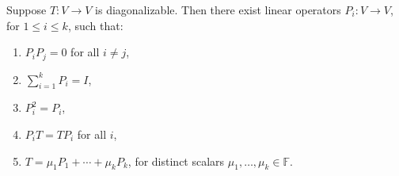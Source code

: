 \begin{corollary}\label{cor:spectral-decomposition}
Suppose \(T : V \to V\) is diagonalizable. Then there exist linear operators \(P_i : V \to V\), for \(1 \leq i \leq k\), such that:
\begin{enumerate}
    \item \(P_i P_j = 0\) for all \(i \neq j\),
    \item \(\sum_{i=1}^k P_i = I\),
    \item \(P_i^2 = P_i\),
    \item \(P_i T = T P_i\) for all \(i\),
    \item \(T = \mu_1 P_1 + \cdots + \mu_k P_k\), for distinct scalars \(\mu_1, \ldots, \mu_k \in \mathbb{F}\).
\end{enumerate}
\end{corollary}

